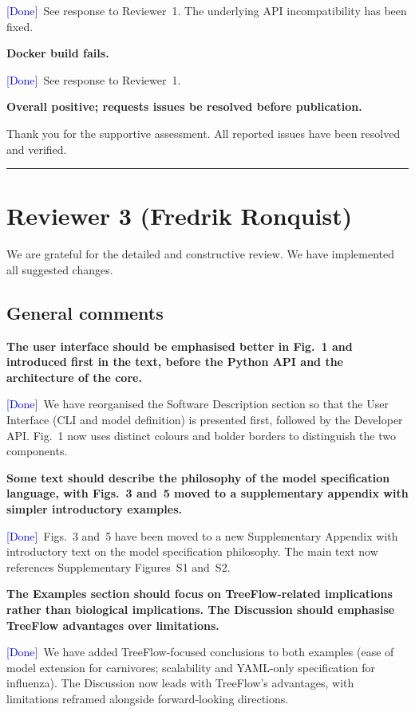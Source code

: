 \documentclass[11pt]{article}
\newcommand{\comment}[1]{\medskip\noindent\textbf{#1}\medskip}
\newcommand{\response}[1]{\noindent #1\medskip}
\newcommand{\done}{\textcolor{blue}{[Done]}}
\begin{document}
\response{\done\ See response to Reviewer~1. The underlying API incompatibility has been fixed.}

\comment{Docker build fails.}

\response{\done\ See response to Reviewer~1.}

\comment{Overall positive; requests issues be resolved before publication.}

\response{Thank you for the supportive assessment. All reported issues have been resolved and verified.}

\bigskip
\hrule
\bigskip

\section*{Reviewer 3 (Fredrik Ronquist)}

We are grateful for the detailed and constructive review. We have implemented all suggested changes.

\subsection*{General comments}

\comment{The user interface should be emphasised better in Fig.~1 and introduced first in the text, before the Python API and the architecture of the core.}

\response{\done\ We have reorganised the Software Description section so that the User Interface (CLI and model definition) is presented first, followed by the Developer API. Fig.~1 now uses distinct colours and bolder borders to distinguish the two components.}

\comment{Some text should describe the philosophy of the model specification language, with Figs.~3 and~5 moved to a supplementary appendix with simpler introductory examples.}

\response{\done\ Figs.~3 and~5 have been moved to a new Supplementary Appendix with introductory text on the model specification philosophy. The main text now references Supplementary Figures~S1 and~S2.}

\comment{The Examples section should focus on TreeFlow-related implications rather than biological implications. The Discussion should emphasise TreeFlow advantages over limitations.}

\response{\done\ We have added TreeFlow-focused conclusions to both examples (ease of model extension for carnivores; scalability and YAML-only specification for influenza). The Discussion now leads with TreeFlow's advantages, with limitations reframed alongside forward-looking directions.}
\end{document}
